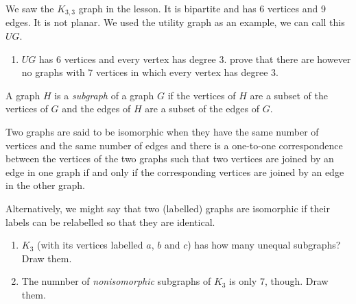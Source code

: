 \documentclass[a4paper]{article}
\begin{document}
We saw the $K_{3,3}$ graph in the lesson. It is bipartite and has 6 vertices and 9 edges. It is not planar. We used the utility graph as an example, we can call this $UG$. 

\begin{enumerate}[resume]
	\item $UG$ has 6 vertices and every vertex has degree 3. prove that there are however no graphs with 7 vertices in which every vertex has degree 3.
\end{enumerate}

A graph $H$ is a \textit{subgraph} of a graph $G$ if the vertices of $H$ are a subset of the vertices of $G$ and the edges of $H$ are a subset of the edges of $G$.

Two graphs are said to be isomorphic when they have the same number of vertices and the same number of edges and there is a one-to-one correspondence between the vertices of the two graphs such that two vertices are joined by an edge in one graph if and only if the corresponding vertices are joined by an edge in the other graph.

Alternatively, we might say that two (labelled) graphs are isomorphic if their labels can be relabelled so that they are identical. 

\begin{enumerate}[resume]
	\item $K_3$ (with its vertices labelled $a$, $b$ and $c$) has how many unequal subgraphs? Draw them. 
	\item The numnber of \emph{nonisomorphic} subgraphs of $K_3$ is only 7, though. Draw them.
\end{enumerate}
\end{document}

